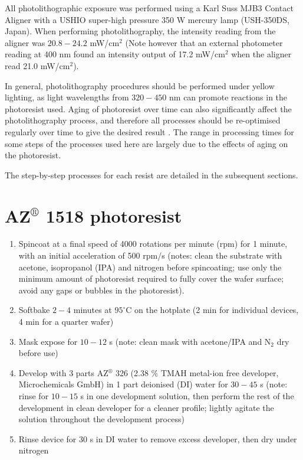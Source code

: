 \documentclass[
  a4paper,
]{scrbook}
\begin{document}
All photolithographic exposure was performed using a Karl Suss MJB3
Contact Aligner with a USHIO super-high pressure 350 W mercury lamp
(USH-350DS, Japan). When performing photolithography, the intensity
reading from the aligner was \(20.8-24.2\) mW/cm\(^2\) (Note however
that an external photometer reading at 400 nm found an intensity output
of 17.2 mW/cm\(^2\) when the aligner read 21.0 mW/cm\(^2\)).

In general, photolithography procedures should be performed under yellow
lighting, as light wavelengths from \(320-450\) nm can promote reactions
in the photoresist used. Aging of photoresist over time can also
significantly affect the photolithography process, and therefore all
processes should be re-optimised regularly over time to give the desired
result \autocite{Microchemicals}. The range in processing times for some
steps of the processes used here are largely due to the effects of aging
on the photoresist.

The step-by-step processes for each resist are detailed in the
subsequent sections.

\hypertarget{azcircledr-1518-photoresist}{%
\section{\texorpdfstring{AZ\(^\circledR\) 1518
photoresist}{AZ\^{}\textbackslash circledR 1518 photoresist}}\label{azcircledr-1518-photoresist}}

\begin{enumerate}
\def\labelenumi{\arabic{enumi}.}
\item
  Spincoat at a final speed of 4000 rotations per minute (rpm) for 1
  minute, with an initial acceleration of 500 rpm/s (notes: clean the
  substrate with acetone, isopropanol (IPA) and nitrogen before
  spincoating; use only the minimum amount of photoresist required to
  fully cover the wafer surface; avoid any gaps or bubbles in the
  photoresist).
\item
  Softbake \(2-4\) minutes at \(95^\circ\)C on the hotplate (2 min for
  individual devices, 4 min for a quarter wafer)
\item
  Mask expose for \(10-12\) s (note: clean mask with acetone/IPA and
  N\(_2\) dry before use)
\item
  Develop with 3 parts AZ\(^\circledR\) 326 (2.38 \% TMAH metal-ion free
  developer, Microchemicals GmbH) in 1 part deionised (DI) water for
  \(30-45\) s (note: rinse for \(10-15\) s in one development solution,
  then perform the rest of the development in clean developer for a
  cleaner profile; lightly agitate the solution throughout the
  development process)
\item
  Rinse device for 30 s in DI water to remove excess developer, then dry
  under nitrogen
\end{enumerate}
\end{document}
